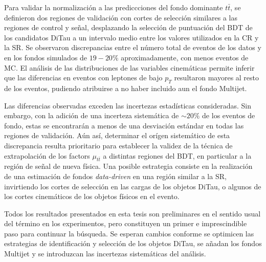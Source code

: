 Para validar la normalización a las prediccciones del fondo dominante $t\bar{t}$, se definieron dos regiones de validación con cortes de selección similares a las regiones de control y señal, desplazando la selección de puntuación del BDT de los candidatos DiTau a un intervalo medio entre los valores utilizados en la CR y la SR. Se observaron discrepancias entre el número total de eventos de los datos y en los fondos simulados de $19-20\%$ aproximadamente, con menos eventos de MC. El análisis de las distribuciones de las variables cinemáticas permite inferir que las diferencias en eventos con leptones de bajo $p_T$ resultaron mayores al resto de los eventos, pudiendo atribuirse a no haber incluido aun el fondo Multijet.

Las diferencias observadas exceden las incertezas estadísticas consideradas. Sin embargo, con la adición de una incerteza sistemática de $\sim 20\%$ de los eventos de fondo, estas se encontrarán a menos de una desviación estándar en todas las regiones de validación. Aún así, determinar el orígen sistemático de esta discrepancia resulta prioritario para establecer la validez de la técnica de extrapolación de los factors $\mu_{t\bar{t}}$ a distintas regiones del BDT, en particular a la región de señal de nueva física. Una posible estrategia consiste en la realización de una estimación de fondos \textit{data-driven} en una región similar a la SR, invirtiendo los cortes de selección en las cargas de los objetos DiTau, o algunos de los cortes cinemáticos de los objetos físicos en el evento.

Todos los resultados presentados en esta tesis son preliminares en el sentido usual del término en los experimentos, pero constituyen un primer e imprescindible paso para continuar la búsqueda. Se esperan cambios conforme se optimicen las estrategias de identificación y selección de los objetos DiTau, se añadan los fondos Multijet y se introduzcan las incertezas sistemáticas del análisis.

\cleardoublepage{}